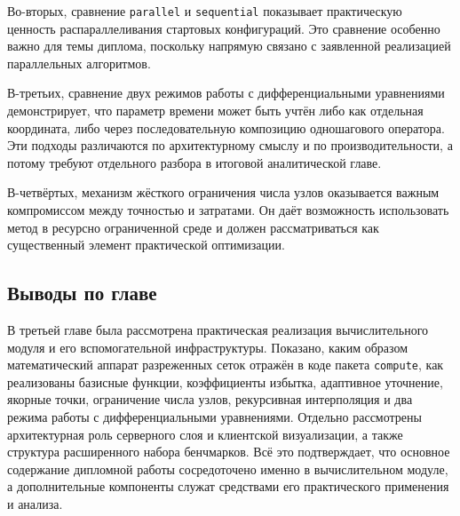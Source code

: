 Во-вторых, сравнение \texttt{parallel} и \texttt{sequential} показывает практическую ценность распараллеливания стартовых конфигураций. Это сравнение особенно важно для темы диплома, поскольку напрямую связано с заявленной реализацией параллельных алгоритмов.

В-третьих, сравнение двух режимов работы с дифференциальными уравнениями демонстрирует, что параметр времени может быть учтён либо как отдельная координата, либо через последовательную композицию одношагового оператора. Эти подходы различаются по архитектурному смыслу и по производительности, а потому требуют отдельного разбора в итоговой аналитической главе.

В-четвёртых, механизм жёсткого ограничения числа узлов оказывается важным компромиссом между точностью и затратами. Он даёт возможность использовать метод в ресурсно ограниченной среде и должен рассматриваться как существенный элемент практической оптимизации.

\subsection*{Выводы по главе}

В третьей главе была рассмотрена практическая реализация вычислительного модуля и его вспомогательной инфраструктуры. Показано, каким образом математический аппарат разреженных сеток отражён в коде пакета \texttt{compute}, как реализованы базисные функции, коэффициенты избытка, адаптивное уточнение, якорные точки, ограничение числа узлов, рекурсивная интерполяция и два режима работы с дифференциальными уравнениями. Отдельно рассмотрены архитектурная роль серверного слоя и клиентской визуализации, а также структура расширенного набора бенчмарков. Всё это подтверждает, что основное содержание дипломной работы сосредоточено именно в вычислительном модуле, а дополнительные компоненты служат средствами его практического применения и анализа.
